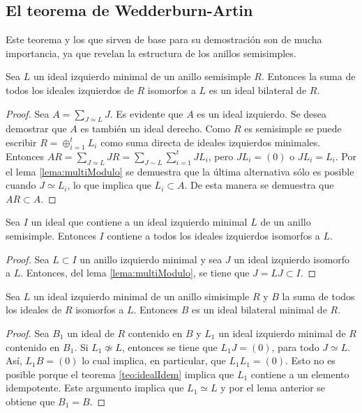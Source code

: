 \subsection{El teorema de Wedderburn-Artin}
Este teorema y los que sirven de base para su demostración son de mucha importancia, ya que revelan la estructura de los anillos semisimples.
\begin{lema}
Sea $L$ un ideal izquierdo minimal de un anillo semisimple $R$. Entonces la suma de todos los ideales izquierdos de $R$ isomorfos a $L$ es un ideal bilateral de $R$.
\end{lema}
\begin{proof}
Sea $A = \sum_{J \simeq L}J$. Es evidente que $A$ es un ideal izquierdo. Se desea demostrar que $A$ es también un ideal derecho. Como $R$ es semisimple se puede escribir $R = \oplus_{i = 1}^tL_i$ como suma directa de ideales izquierdos minimales. Entonces $AR = \sum_{J \simeq L}JR = \sum_{J \sim L}\sum_{i=1}^{t}JL_i$, pero $JL_i = (0)$ o $JL_i = L_i$. Por el lema \ref{lema:multiModulo} se demuestra que la última alternativa sólo es posible cuando $J \simeq L_i$, lo que implica que $L_i \subset A$. De esta manera se demuestra que $AR \subset A$.
\end{proof}
\begin{lema}
Sea $I$ un ideal que contiene a un ideal izquierdo minimal $L$ de un anillo semisimple. Entonces $I$ contiene a todos los ideales izquierdos isomorfos a $L$.
\end{lema}
\begin{proof}
Sea $ L \subset I$ un anillo izquierdo minimal y sea $J$ un ideal izquierdo isomorfo a $L$. Entonces, del lema \ref{lema:multiModulo}, se tiene que $J = LJ \subset I$. 
\end{proof}
\begin{proposicion}
Sea $L$ un ideal izquierdo minimal de un anillo simisimple $R$ y $B$ la suma de todos los ideales de $R$ isomorfos a $L$. Entonces $B$ es un ideal bilateral minimal de $R$.
\end{proposicion}
\begin{proof}
Sea $B_1$ un ideal de $R$ contenido en $B$ y $L_1$ un ideal izquierdo minimal de $R$ contenido en $B_1$. Si $L_1 \not\simeq L$, entonces se tiene que $L_1J = (0)$, para todo $J \simeq L$. Así, $L_1B = (0)$ lo cual implica, en particular, que $L_1L_1 = (0)$. Esto no es posible porque el teorema \ref{teo:idealIdem}  implica que $L_1$ contiene a un elemento idempotente. Este argumento implica que $L_1 \simeq L$ y por el lema anterior se obtiene que $B_1 = B$. 
\end{proof}
